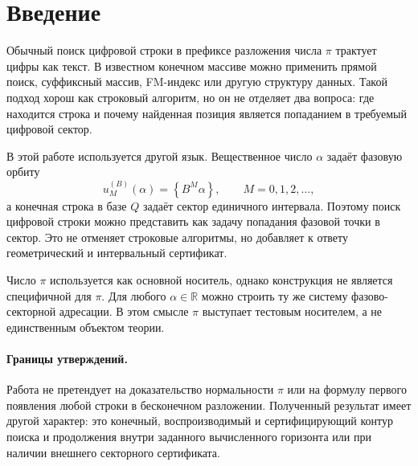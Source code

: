 \documentclass[11pt,a4paper]{article}
\newcommand{\fracpart}[1]{\left\{#1\right\}}
\newcommand{\R}{\mathbb{R}}
\begin{document}
\tableofcontents
\newpage

\section{Введение}

Обычный поиск цифровой строки в префиксе разложения числа $\pi$ трактует цифры как текст.  В известном конечном массиве можно применить прямой поиск, суффиксный массив, FM-индекс или другую структуру данных.  Такой подход хорош как строковый алгоритм, но он не отделяет два вопроса: где находится строка и почему найденная позиция является попаданием в требуемый цифровой сектор.

В этой работе используется другой язык.  Вещественное число $\alpha$ задаёт фазовую орбиту
\[
  u_M^{(B)}(\alpha)=\fracpart{B^M\alpha},\qquad M=0,1,2,\dots,
\]
а конечная строка в базе $Q$ задаёт сектор единичного интервала.  Поэтому поиск цифровой строки можно представить как задачу попадания фазовой точки в сектор.  Это не отменяет строковые алгоритмы, но добавляет к ответу геометрический и интервальный сертификат.

Число $\pi$ используется как основной носитель, однако конструкция не является специфичной для $\pi$.  Для любого $\alpha\in\R$ можно строить ту же систему фазово-секторной адресации.  В этом смысле $\pi$ выступает тестовым носителем, а не единственным объектом теории.

\paragraph{Границы утверждений.}  Работа не претендует на доказательство нормальности $\pi$ или на формулу первого появления любой строки в бесконечном разложении.  Полученный результат имеет другой характер: это конечный, воспроизводимый и сертифицирующий контур поиска и продолжения внутри заданного вычисленного горизонта или при наличии внешнего секторного сертификата.
\end{document}
